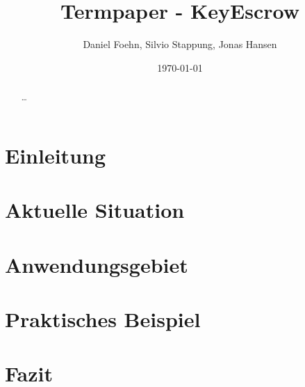 \documentclass[a4paper, 10pt, fleqn]{article}
\title{Termpaper - KeyEscrow}
\author{Daniel Foehn, Silvio Stappung, Jonas Hansen}
\date{\today} %
\begin{document}
\begin{titlepage}
	\maketitle
	\thispagestyle{empty}
	\begin{figure}
		\centering
	\end{figure}
\end{titlepage}

\tableofcontents
\listoffigures
\clearpage

\begin{abstract}
	\ldots
\end{abstract}

\clearpage
\section{Einleitung}
 

\clearpage
\section{Aktuelle Situation}
	

\clearpage
\section{Anwendungsgebiet}
	

\clearpage
\section{Praktisches Beispiel}
	 

\clearpage
\section{Fazit}

\nocite{*}
\clearpage


\end{document}
